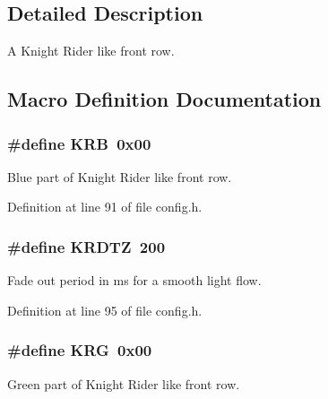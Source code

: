\subsection{Detailed Description}
A Knight Rider like front row. 



\subsection{Macro Definition Documentation}
\subsubsection[{\texorpdfstring{K\+RB}{KRB}}]{\setlength{\rightskip}{0pt plus 5cm}\#define K\+RB~0x00}\hypertarget{group__knightrider_gaa315fefb5665924b7d512104bc3965cd}{}\label{group__knightrider_gaa315fefb5665924b7d512104bc3965cd}


Blue part of Knight Rider like front row. 



Definition at line 91 of file config.\+h.

\subsubsection[{\texorpdfstring{K\+R\+D\+TZ}{KRDTZ}}]{\setlength{\rightskip}{0pt plus 5cm}\#define K\+R\+D\+TZ~200}\hypertarget{group__knightrider_ga64a0c208656bb11ad944489886089b7e}{}\label{group__knightrider_ga64a0c208656bb11ad944489886089b7e}


Fade out period in ms for a smooth light flow. 



Definition at line 95 of file config.\+h.

\subsubsection[{\texorpdfstring{K\+RG}{KRG}}]{\setlength{\rightskip}{0pt plus 5cm}\#define K\+RG~0x00}\hypertarget{group__knightrider_ga47a5cb8daecea854270c0d09c3ebc24c}{}\label{group__knightrider_ga47a5cb8daecea854270c0d09c3ebc24c}


Green part of Knight Rider like front row. 



